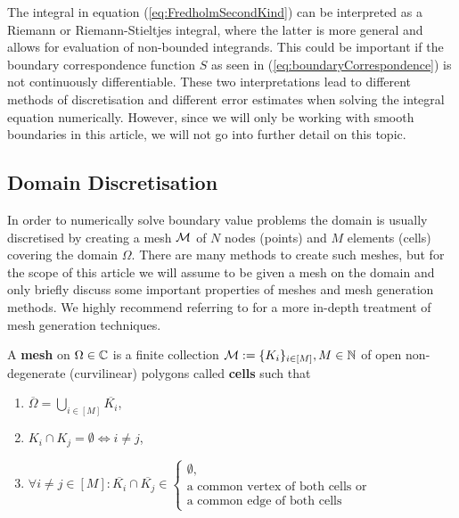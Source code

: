 \begin{remark}
    The integral in equation (\ref{eq:FredholmSecondKind}) can be interpreted as a Riemann or Riemann-Stieltjes integral, where the latter is more general and allows for evaluation of non-bounded integrands. This could be important if the boundary correspondence function $S$ as seen in (\ref{eq:boundaryCorrespondence}) is not continuously differentiable. These two interpretations lead to different methods of discretisation and different error estimates when solving the integral equation numerically.
    However, since we will only be working with smooth boundaries in this article, we will not go into further detail on this topic.
\end{remark}




\subsection{Domain Discretisation} \label{chap:Meshes}
In order to numerically solve boundary value problems the domain is usually discretised by creating a mesh $\mathcal{M}$ of $N$ nodes (points) and $M$ elements (cells) covering the domain $\Omega$. 
There are many methods to create such meshes, but for the scope of this article we will assume to be given a mesh on the domain and only briefly discuss some important properties of meshes and mesh generation methods. We highly recommend referring to \cite{Brown1990_SC_meshgen} for a more in-depth treatment of mesh generation techniques.

\begin{definition}
    A \textbf{mesh} on $\Omega\in\mathbb{C}$ is a finite collection $\mathcal{M}:= \{K_i\}_{i\in [M]}, M\in\mathbb{N}$ of open non-degenerate (curvilinear) polygons called \textbf{cells} such that
    \begin{enumerate}
        \item $\overline{\Omega} = \displaystyle\bigcup_{i\in [M]} \overline{K_i}$,
        \item $K_i \cap K_j = \emptyset \iff i\neq j$,
        \item $\forall i\neq j\in[M]:
        \overline{K_i} \cap \overline{K_j}\in
        \begin{cases}
        \emptyset,\\
        \text{a common vertex of both cells or } \\
        \text{a common edge of both cells}
        \end{cases}$
    \end{enumerate}
\end{definition}

